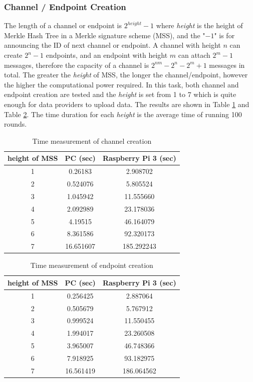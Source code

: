 \documentclass[conference]{IEEEtran}
\begin{document}
\subsubsection{Channel / Endpoint Creation}
The length of a channel or endpoint is $2^{height}-1$ where \textit{height} is the height of Merkle Hash Tree in a Merkle signature scheme (MSS), and the "$-1$" is for announcing the ID of next channel or endpoint. A channel with height $n$ can create $2^n-1$ endpoints, and an endpoint with height $m$ can attach $2^m-1$ messages, therefore the capacity of a channel is $2^{nm}-2^n-2^m+1$ messages in total. The greater the \textit{height} of MSS, the longer the channel/endpoint, however the higher the computational power required. In this task, both channel and endpoint creation are tested and the \textit{height} is set from 1 to 7 which is quite enough for data providers to upload data. The results are shown in Table \ref{tab:channel_create} and Table \ref{tab:endpoint_create}. The time duration for each \textit{height} is the average time of running 100 rounds.

\begin{table}[htbp]
	\caption{Time measurement of channel creation}
	\label{tab:channel_create}
	\begin{center}
	\begin{tabular}{|c|c|c|}
	\hline
		\textbf{height of MSS} & \textbf{PC (sec)} & \textbf{Raspberry Pi 3 (sec)} \\ 
		\hline
		1 & 0.26183 & 2.908702 \\ 
		2 & 0.524076 & 5.805524 \\ 
		3 & 1.045942 & 11.555660 \\ 
		4 & 2.092989 & 23.178036 \\ 
		5 & 4.19515 & 46.164079\\ 
		6 & 8.361586 & 92.320173\\ 
		7 & 16.651607 & 185.292243\\
		\hline
	\end{tabular}
	\end{center}
\end{table}

\begin{table}[htbp]
	\caption{Time measurement of endpoint creation}
	\label{tab:endpoint_create}
	\begin{center}
	\begin{tabular}{|c|c|c|}
	\hline
		\textbf{height of MSS} & \textbf{PC (sec)} & \textbf{Raspberry Pi 3 (sec)} \\ 
		\hline
		1 & 0.256425 & 2.887064 \\ 
		2 & 0.505679 & 5.767912 \\ 
		3 & 0.999524 & 11.550455 \\ 
		4 & 1.994017 & 23.260508 \\ 
		5 & 3.965007 & 46.748366 \\ 
		6 & 7.918925 & 93.182975 \\ 
		7 & 16.561419 & 186.064562 \\
		\hline
	\end{tabular}
	\end{center}
\end{table}
\end{document}
